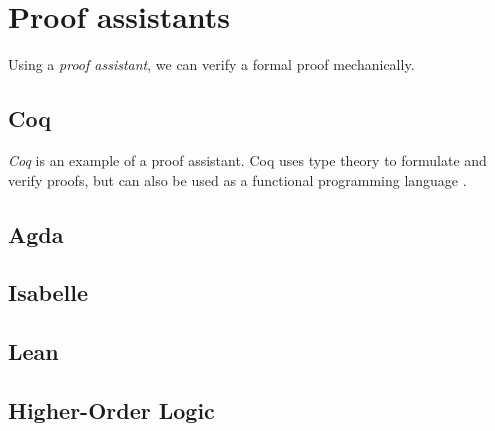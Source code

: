 \chapter{Proof assistants}

Using a \textit{proof assistant}, we can verify a formal proof mechanically.

\section{Coq}
\textit{Coq} is an example of a proof assistant. 
Coq uses type theory to formulate and verify proofs, but can also be used as a functional programming language \cite{cintro}.

\section{Agda}

\section{Isabelle}

\section{Lean}

\section{Higher-Order Logic}
